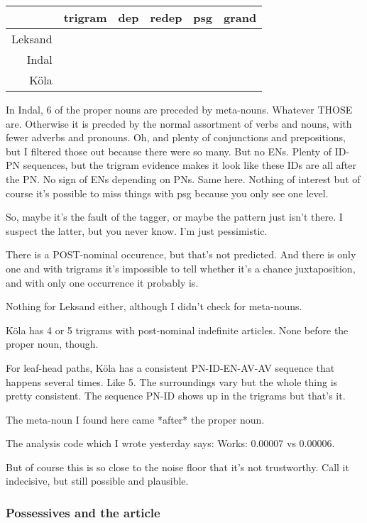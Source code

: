 \begin{table}
  \begin{tabular}{r|ccccc}
    & trigram & dep & redep & psg & grand \\ \hline
    Leksand & \\
    Indal & \\
    K\"ola & \\
    \end{tabular}
\end{table}

In Indal, 6 of the proper nouns are preceded by
meta-nouns. Whatever THOSE are. Otherwise it is precded by the normal
assortment of verbs and nouns, with fewer adverbs and pronouns. Oh,
and plenty of conjunctions and prepositions, but I filtered those out
because there were so many. But no ENs.
Plenty of ID-PN sequences, but the trigram evidence makes it look like
these IDs are all after the PN. No sign of ENs depending on PNs.
Same here.
Nothing of interest but of course it's possible to miss things with
psg because you only see one level.

So, maybe it's the fault of the tagger, or maybe the pattern just
isn't there. I suspect the latter, but you never know. I'm just
pessimistic.

There is a POST-nominal occurence, but that's not predicted. And
there is only one and with trigrams it's impossible to tell whether
it's a chance juxtaposition, and with only one occurrence it probably
is.

Nothing for Leksand either, although I didn't check for meta-nouns.

K\"ola has 4 or 5 trigrams with post-nominal indefinite articles. None
before the proper noun, though.

For leaf-head paths, K\"ola has a consistent PN-ID-EN-AV-AV sequence
that happens several times. Like 5. The surroundings vary but the
whole thing is pretty consistent. The sequence PN-ID shows up in the
trigrams but that's it.

The meta-noun I found here came *after* the proper noun.

The analysis code which I wrote yesterday says:
Works: 0.00007 vs 0.00006.

But of course this is so close to the noise floor that it's not
trustworthy. Call it indecisive, but still possible and plausible.

\subsubsection{Possessives and the article}

